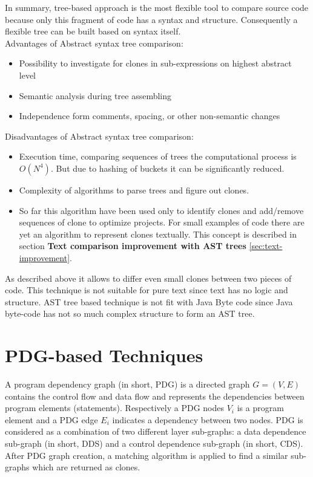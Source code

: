 \documentclass{report}
\begin{document}
In summary, tree-based approach is the most flexible tool to compare source code because only this fragment of code has a syntax and structure. Consequently a flexible tree can be built based on syntax itself. \\
Advantages of Abstract syntax tree comparison:
\begin{itemize}
	\item Possibility to investigate for clones in sub-expressions on highest abstract level
	\item Semantic analysis during tree assembling 
	\item Independence form comments, spacing, or other non-semantic changes
\end{itemize}
Disadvantages of Abstract syntax tree comparison:
\begin{itemize}
	\item Execution time, comparing sequences of trees the computational process is $O(N^4)$. But due to hashing of buckets it can be significantly reduced.
	\item Complexity of algorithms to parse trees and figure out clones.
	\item So far this algorithm have been used only to identify clones and add/remove sequences of clone to optimize projects. For small examples of code there are yet an algorithm to represent clones textually. This concept is described in section \textbf{Text comparison improvement with AST trees} \ref{sec:text-improvement}.
\end{itemize}
As described above it allows to differ even small clones between two pieces of code. This technique is not suitable for pure text since text has no logic and structure. AST tree based technique is not fit with Java Byte code since Java byte-code has not so much complex structure to form an AST tree.


\section{PDG-based Techniques}
\label{sec: pdg_tech}

A program dependency graph (in short, PDG) is a directed graph $ G = (V, E)$ contains the control flow and data flow and represents the dependencies between program elements (statements). Respectively a PDG nodes $V_{i}$ is a program element and a PDG edge $E_{i}$ indicates a dependency between two nodes. PDG is considered as a combination of two different layer sub-graphs: a data dependence sub-graph (in short, DDS) and a control dependence sub-graph (in short, CDS).
After PDG graph creation, a matching algorithm is applied to find a similar sub-graphs which are returned as clones.
\end{document}
